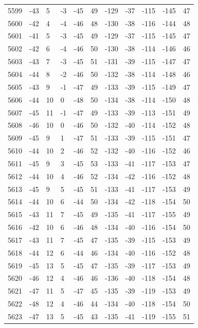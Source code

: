 \begin{table}[H]
\begin{tabular}{lllllllllll}
5599 & -43 & 5 & -3 & -45 & 49 & -129 & -37 & -115 & -145 & 47 \\
5600 & -42 & 4 & -4 & -46 & 48 & -130 & -38 & -116 & -144 & 48 \\
5601 & -41 & 5 & -3 & -45 & 49 & -129 & -37 & -115 & -145 & 47 \\
5602 & -42 & 6 & -4 & -46 & 50 & -130 & -38 & -114 & -146 & 46 \\
5603 & -43 & 7 & -3 & -45 & 51 & -131 & -39 & -115 & -147 & 47 \\
5604 & -44 & 8 & -2 & -46 & 50 & -132 & -38 & -114 & -148 & 46 \\
5605 & -43 & 9 & -1 & -47 & 49 & -133 & -39 & -115 & -149 & 47 \\
5606 & -44 & 10 & 0 & -48 & 50 & -134 & -38 & -114 & -150 & 48 \\
5607 & -45 & 11 & -1 & -47 & 49 & -133 & -39 & -113 & -151 & 49 \\
5608 & -46 & 10 & 0 & -46 & 50 & -132 & -40 & -114 & -152 & 48 \\
5609 & -45 & 9 & 1 & -47 & 51 & -133 & -39 & -115 & -151 & 47 \\
5610 & -44 & 10 & 2 & -46 & 52 & -132 & -40 & -116 & -152 & 46 \\
5611 & -45 & 9 & 3 & -45 & 53 & -133 & -41 & -117 & -153 & 47 \\
5612 & -44 & 10 & 4 & -46 & 52 & -134 & -42 & -116 & -152 & 48 \\
5613 & -45 & 9 & 5 & -45 & 51 & -133 & -41 & -117 & -153 & 49 \\
5614 & -44 & 10 & 6 & -44 & 50 & -134 & -42 & -118 & -154 & 50 \\
5615 & -43 & 11 & 7 & -45 & 49 & -135 & -41 & -117 & -155 & 49 \\
5616 & -42 & 10 & 6 & -46 & 48 & -134 & -40 & -116 & -154 & 50 \\
5617 & -43 & 11 & 7 & -45 & 47 & -135 & -39 & -115 & -153 & 49 \\
5618 & -44 & 12 & 6 & -44 & 46 & -134 & -40 & -116 & -152 & 48 \\
5619 & -45 & 13 & 5 & -45 & 47 & -135 & -39 & -117 & -153 & 49 \\
5620 & -46 & 12 & 4 & -46 & 46 & -136 & -40 & -118 & -154 & 48 \\
5621 & -47 & 11 & 5 & -47 & 45 & -135 & -39 & -119 & -153 & 49 \\
5622 & -48 & 12 & 4 & -46 & 44 & -134 & -40 & -118 & -154 & 50 \\
5623 & -47 & 13 & 5 & -45 & 43 & -135 & -41 & -119 & -155 & 51 \\

\end{tabular}
\end{table}
